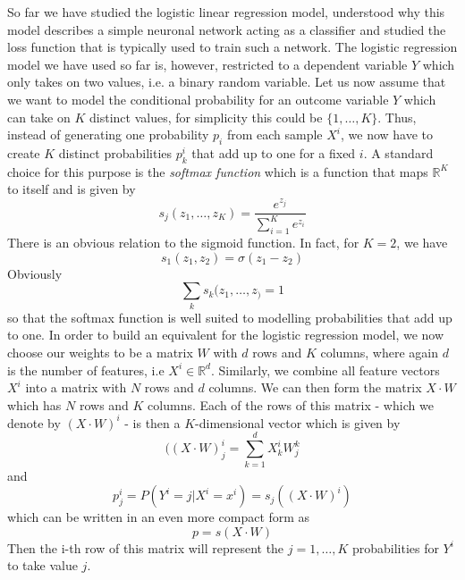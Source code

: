 \documentclass[a4paper, draft]{report}
\numberwithin{section}{chapter}
\numberwithin{equation}{chapter}
\theoremstyle{own}
\theoremstyle{remark}
\newcommand{\R}{\mathbb{R}}
\begin{document}
So far we have studied the logistic linear regression model, understood why this model describes a simple neuronal network acting as a classifier and studied the loss function that is typically used to train such a network. The logistic regression model we have used so far is, however, restricted to a dependent variable $Y$ which only takes on two values, i.e. a binary random variable.  Let us now assume that we want to model the conditional probability for an outcome variable $Y$ which can take on $K$ distinct values, for simplicity this could be $\{1, \dots, K\}$. Thus, instead of generating one probability $p_i$ from each sample $X^i$, we now have to create $K$ distinct probabilities $p^i_k$ that add up to one for a fixed $i$. A standard choice for this purpose is the {\em softmax function} which is a function that maps $\R^K$ to itself and is given by 
$$
s_j(z_1, \dots, z_K) = \frac{e^{z_j}}{\sum_{i=1}^K e^{z_i}}
$$
There is an obvious relation to the sigmoid function. In fact, for $K=2$, we have
$$
s_1 (z_1, z_2) = \sigma(z_1 - z_2)
$$
Obviously
$$
\sum_k s_k(z_1, \dots, z_) = 1
$$
so that the softmax function is well suited to modelling probabilities that add up to one.  In order to build an equivalent for the logistic regression model, we now choose our weights to be a matrix $W$ with $d$ rows and $K$ columns, where again $d$ is the number of features, i.e
$X^i \in \R^d$. Similarly, we combine all feature vectors $X^i$ into a matrix with $N$ rows and $d$ columns. We can then form the matrix $X \cdot W$ which has $N$ rows and $K$ columns. Each of the rows of this matrix - which we denote by $(X \cdot W)^i$ - is then a $K$-dimensional vector which is given by
$$
((X \cdot W)^i_j = \sum_{k=1}^d X^i_k W^k_j
$$
and 
$$
p^i_j = P(Y^i = j | X^i = x^i) = s_j((X \cdot W)^i)
$$
which can be written in an even more compact form as
$$
p = s(X \cdot W)
$$
Then the i-th row of this matrix will represent the $j = 1, \dots, K$ probabilities for $Y^i$ to take value $j$.  
\end{document}
